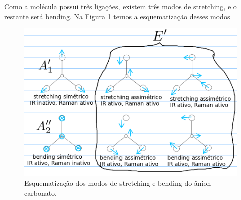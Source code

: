 \documentclass[a4paper,10pt]{article}
\begin{document}
\n


Como a molécula possui três ligações, existem três modos de stretching, e o restante será bending. Na Figura \ref{fig:stretch_bend} temos a esquematização desses modos
\begin{figure}[H]
\centering
\includegraphics[height=0.4\linewidth]{fig/stretch_bend_my.png}
\caption{Esquematização dos modos de stretching e bending do ânion carbonato.}
\label{fig:stretch_bend}
\end{figure}
\end{document}
